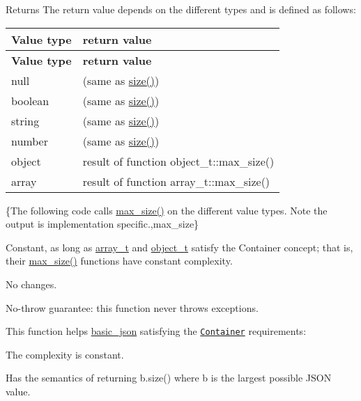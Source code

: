 \begin{DoxyReturn}{Returns}
The return value depends on the different types and is defined as follows\+: \tabulinesep=1mm
\begin{longtabu} spread 0pt [c]{*{2}{|X[-1]}|}
\hline
\rowcolor{\tableheadbgcolor}\textbf{ Value type }&\textbf{ return value  }\\
\endfirsthead
\hline
\endfoot
\hline
\rowcolor{\tableheadbgcolor}\textbf{ Value type }&\textbf{ return value  }\\
\endhead
null &{} (same as {\ttfamily \hyperlink{classnlohmann_1_1basic__json_a25e27ad0c6d53c01871c5485e1f75b96}{size()}}) \\
boolean &{} (same as {\ttfamily \hyperlink{classnlohmann_1_1basic__json_a25e27ad0c6d53c01871c5485e1f75b96}{size()}}) \\
string &{} (same as {\ttfamily \hyperlink{classnlohmann_1_1basic__json_a25e27ad0c6d53c01871c5485e1f75b96}{size()}}) \\
number &{} (same as {\ttfamily \hyperlink{classnlohmann_1_1basic__json_a25e27ad0c6d53c01871c5485e1f75b96}{size()}}) \\
object &result of function {\ttfamily object\+\_\+t\+::max\+\_\+size()} \\
array &result of function {\ttfamily array\+\_\+t\+::max\+\_\+size()} \\
\end{longtabu}
\{The following code calls {\ttfamily \hyperlink{classnlohmann_1_1basic__json_a2f47d3c6a441c57dd2be00449fbb88e1}{max\+\_\+size()}} on the different value types. Note the output is implementation specific.,max\+\_\+size\}
\end{DoxyReturn}
Constant, as long as \hyperlink{classnlohmann_1_1basic__json_ae095578e03df97c5b3991787f1056374}{array\+\_\+t} and \hyperlink{classnlohmann_1_1basic__json_a5e48a7893520e1314bf0c9723e26ea2a}{object\+\_\+t} satisfy the Container concept; that is, their {\ttfamily \hyperlink{classnlohmann_1_1basic__json_a2f47d3c6a441c57dd2be00449fbb88e1}{max\+\_\+size()}} functions have constant complexity.

No changes.

No-\/throw guarantee\+: this function never throws exceptions.

This function helps {\ttfamily \hyperlink{classnlohmann_1_1basic__json}{basic\+\_\+json}} satisfying the \href{http://en.cppreference.com/w/cpp/concept/Container}{\tt Container} requirements\+:
\begin{DoxyItemize}
\item The complexity is constant.
\item Has the semantics of returning {\ttfamily b.\+size()} where {\ttfamily b} is the largest possible J\+S\+ON value.
\end{DoxyItemize}

